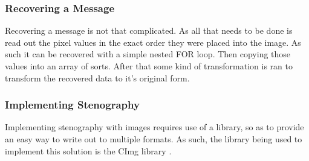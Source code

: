 \documentclass[12pt]{article}
\begin{document}
    
    \subsubsection{Recovering a Message}    
      Recovering a message is not that complicated. As all that needs
      to be done is read out the pixel values in the exact order they
      were placed into the image. As such it can be recovered with a
      simple nested FOR loop. Then copying those values into an array
      of sorts. After that some kind of transformation is ran to
      transform the recovered data to it's original form.

    \subsubsection{Implementing Stenography}
    Implementing stenography with images requires use of a library, so
    as to provide an easy way to write out to multiple formats. As such,
    the library being used to implement this solution is the CImg library
    \cite{cimg}.



\end{document}
